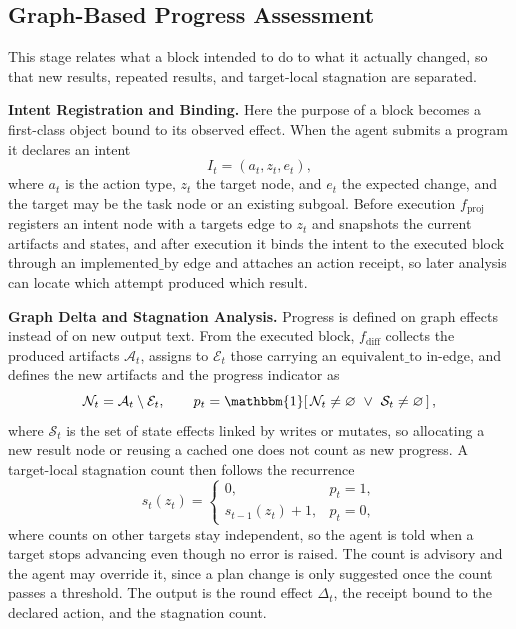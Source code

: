 \subsection{Graph-Based Progress Assessment}
\label{sec:method-progress}

This stage relates what a block intended to do to what it actually changed, so that new results, repeated results, and target-local stagnation are separated.

\textbf{Intent Registration and Binding.}\quad
Here the purpose of a block becomes a first-class object bound to its observed effect.
When the agent submits a program it declares an intent
\begin{equation}
I_t = (a_t, z_t, e_t),
\label{eq:intent}
\end{equation}
where $a_t$ is the action type, $z_t$ the target node, and $e_t$ the expected change, and the target may be the task node or an existing subgoal.
Before execution $f_{\mathrm{proj}}$ registers an intent node with a $\mathrm{targets}$ edge to $z_t$ and snapshots the current artifacts and states, and after execution it binds the intent to the executed block through an $\mathrm{implemented\_by}$ edge and attaches an action receipt, so later analysis can locate which attempt produced which result.

\textbf{Graph Delta and Stagnation Analysis.}\quad
Progress is defined on graph effects instead of on new output text.
From the executed block, $f_{\mathrm{diff}}$ collects the produced artifacts $\mathcal{A}_t$, assigns to $\mathcal{E}_t$ those carrying an $\mathrm{equivalent\_to}$ in-edge, and defines the new artifacts and the progress indicator as
\begin{equation}
\mathcal{N}_t = \mathcal{A}_t \setminus \mathcal{E}_t, \qquad
p_t = \mathbbm{1}\!\left[\, \mathcal{N}_t \neq \varnothing \ \lor\ \mathcal{S}_t \neq \varnothing \,\right],
\label{eq:novel}
\end{equation}
where $\mathcal{S}_t$ is the set of state effects linked by $\mathrm{writes}$ or $\mathrm{mutates}$, so allocating a new result node or reusing a cached one does not count as new progress.
A target-local stagnation count then follows the recurrence
\begin{equation}
s_t(z_t) =
\begin{cases}
0, & p_t = 1, \\
s_{t-1}(z_t) + 1, & p_t = 0,
\end{cases}
\label{eq:stag}
\end{equation}
where counts on other targets stay independent, so the agent is told when a target stops advancing even though no error is raised.
The count is advisory and the agent may override it, since a plan change is only suggested once the count passes a threshold.
The output is the round effect $\Delta_t$, the receipt bound to the declared action, and the stagnation count.

